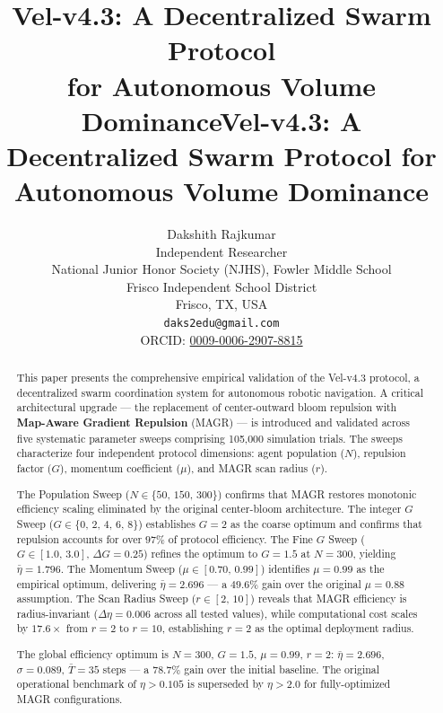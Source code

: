 \documentclass[journal,compsoc]{IEEEtran}
\begin{document}
\title{Vel-v4.3: A Decentralized Swarm Protocol\\for Autonomous Volume Dominance}

\title{Vel-v4.3: A Decentralized Swarm Protocol for Autonomous Volume Dominance}

\author{
    Dakshith Rajkumar \\
    Independent Researcher \\
    National Junior Honor Society (NJHS), Fowler Middle School \\
    Frisco Independent School District \\
    Frisco, TX, USA \\
    \texttt{daks2edu@gmail.com} \\
    ORCID: \href{https://orcid.
org/0009-0006-2907-8815}{0009-0006-2907-8815}
}



\maketitle

\begin{abstract}
This paper presents the comprehensive empirical validation of the Vel-v4.3 protocol,
a decentralized swarm coordination system for autonomous robotic navigation. A critical
architectural upgrade --- the replacement of center-outward bloom repulsion with
\textbf{Map-Aware Gradient Repulsion} (MAGR) --- is introduced and validated across
five systematic parameter sweeps comprising 105{,}000 simulation trials. The sweeps
characterize four independent protocol dimensions: agent population ($N$), repulsion
factor ($G$), momentum coefficient ($\mu$), and MAGR scan radius ($r$).

The Population Sweep ($N \in \{50,\,150,\,300\}$) confirms that MAGR restores monotonic
efficiency scaling eliminated by the original center-bloom architecture. The integer $G$
Sweep ($G \in \{0,\,2,\,4,\,6,\,8\}$) establishes $G=2$ as the coarse optimum and
confirms that repulsion accounts for over $97\%$ of protocol efficiency. The Fine $G$
Sweep ($G \in [1.0,\,3.0]$, $\Delta G=0.25$) refines the optimum to $G=1.5$ at $N=300$,
yielding $\bar{\eta}=1.796$. The Momentum Sweep ($\mu \in [0.70,\,0.99]$) identifies
$\mu=0.99$ as the empirical optimum, delivering $\bar{\eta}=2.696$ --- a $49.6\%$ gain
over the original $\mu=0.88$ assumption. The Scan Radius Sweep ($r \in [2,\,10]$) reveals
that MAGR efficiency is radius-invariant ($\Delta\eta=0.006$ across all tested values),
while computational cost scales by $17.6\times$ from $r=2$ to $r=10$, establishing $r=2$
as the optimal deployment radius.

The global efficiency optimum is $N=300$, $G=1.5$, $\mu=0.99$, $r=2$:
$\bar{\eta}=2.696$, $\sigma=0.089$, $\bar{T}=35$ steps --- a $78.7\%$ gain over the
initial baseline. The original operational benchmark of $\eta>0.105$ is superseded by
$\eta>2.0$ for fully-optimized MAGR configurations.
\end{abstract}
\end{document}
